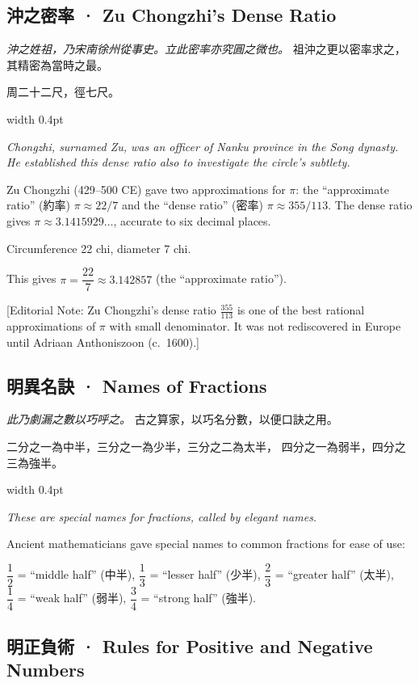 \documentclass[10pt,a4paper]{article}
\newlength{\cnwidth}
\newlength{\enwidth}
\newcommand{\bilingual}[2]{%
  \noindent%
  \begin{minipage}[t]{\cnwidth}%
    #1%
  \end{minipage}%
  \hfill\vrule width 0.4pt\hfill%
  \begin{minipage}[t]{\enwidth}%
    #2%
  \end{minipage}%
  \par\smallskip%
}
\newcommand{\bilingualsubsection}[2]{%
  \subsection*{#1 · #2}
}
\newcommand{\transnote}[1]{%
  \par\smallskip\noindent\textcolor{notecolor}{\small[Editorial Note: #1]}\par\smallskip
}
\begin{document}
\bilingualsubsection{沖之密率}{Zu Chongzhi's Dense Ratio}

\bilingual{%
  \textit{沖之姓祖，乃宋南徐州從事史。立此密率亦究圓之微也。}
  祖沖之更以密率求之，其精密為當時之最。

  周二十二尺，徑七尺。
}{%
  \textit{Chongzhi, surnamed Zu, was an officer of Nanku province in the Song dynasty.
  He established this dense ratio also to investigate the circle's subtlety.}

  Zu Chongzhi (429--500 CE) gave two approximations for $\pi$:
  the ``approximate ratio'' (約率) $\pi \approx 22/7$ and
  the ``dense ratio'' (密率) $\pi \approx 355/113$.
  The dense ratio gives $\pi \approx 3.1415929\ldots$, accurate to six decimal places.

  Circumference 22 chi, diameter 7 chi.

  This gives $\pi = \dfrac{22}{7} \approx 3.142857$ (the ``approximate ratio'').
}

\transnote{Zu Chongzhi's dense ratio $\frac{355}{113}$ is one of the best rational
approximations of $\pi$ with small denominator. It was not rediscovered in Europe
until Adriaan Anthoniszoon (c.\ 1600).}

\bilingualsubsection{明異名訣}{Names of Fractions}

\bilingual{%
  \textit{此乃劇漏之數以巧呼之。}
  古之算家，以巧名分數，以便口訣之用。

  二分之一為中半，三分之一為少半，三分之二為太半，
  四分之一為弱半，四分之三為強半。
}{%
  \textit{These are special names for fractions, called by elegant names.}

  Ancient mathematicians gave special names to common fractions for ease of use:

  $\dfrac{1}{2}$ = ``middle half'' (中半),\quad
  $\dfrac{1}{3}$ = ``lesser half'' (少半),\quad
  $\dfrac{2}{3}$ = ``greater half'' (太半),\\
  $\dfrac{1}{4}$ = ``weak half'' (弱半),\quad
  $\dfrac{3}{4}$ = ``strong half'' (強半).
}

\bilingualsubsection{明正負術}{Rules for Positive and Negative Numbers}
\end{document}
